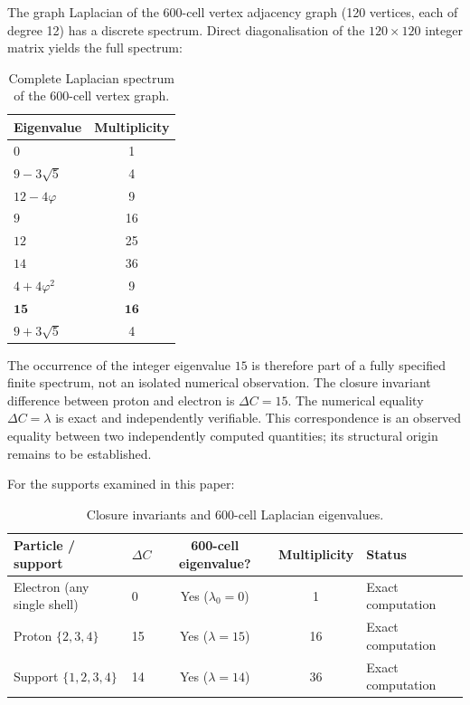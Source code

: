 \documentclass[12pt]{article}
\newcommand{\phig}{\varphi}
\begin{document}
The graph Laplacian of the 600-cell vertex adjacency graph (120 vertices, each of degree 12) has a discrete spectrum. Direct diagonalisation of the $120 \times 120$ integer matrix yields the full spectrum:

\begin{table}[ht]
\centering
\caption{Complete Laplacian spectrum of the 600-cell vertex graph.}
\label{tab:fullspectrum}
\begin{tabular}{@{}lc@{}}
\toprule
Eigenvalue & Multiplicity \\
\midrule
$0$ & 1 \\
$9 - 3\sqrt{5}$ & 4 \\
$12 - 4\phig$ & 9 \\
$9$ & 16 \\
$12$ & 25 \\
$14$ & 36 \\
$4 + 4\phig^2$ & 9 \\
$\boldsymbol{15}$ & $\boldsymbol{16}$ \\
$9 + 3\sqrt{5}$ & 4 \\
\bottomrule
\end{tabular}
\end{table}

The occurrence of the integer eigenvalue $15$ is therefore part of a fully specified finite spectrum, not an isolated numerical observation. The closure invariant difference between proton and electron is $\Delta C = 15$. The numerical equality $\Delta C = \lambda$ is exact and independently verifiable. This correspondence is an observed equality between two independently computed quantities; its structural origin remains to be established.

For the supports examined in this paper:

\begin{table}[ht]
\centering
\caption{Closure invariants and 600-cell Laplacian eigenvalues.}
\label{tab:eigenvalues}
\begin{tabular}{@{}llccl@{}}
\toprule
Particle / support & $\Delta C$ & 600-cell eigenvalue? & Multiplicity & Status \\
\midrule
Electron (any single shell) & 0 & Yes ($\lambda_0 = 0$) & 1 & Exact computation \\
Proton $\{2,3,4\}$ & 15 & Yes ($\lambda = 15$) & 16 & Exact computation \\
Support $\{1,2,3,4\}$ & 14 & Yes ($\lambda = 14$) & 36 & Exact computation \\
\bottomrule
\end{tabular}
\end{table}
\end{document}
